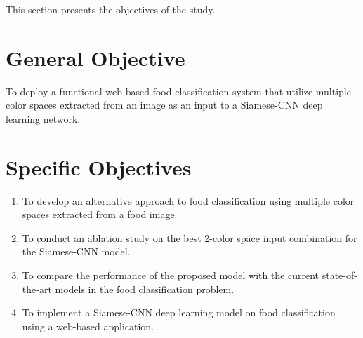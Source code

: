 This section presents the objectives of the study.
\section{General Objective}
To deploy a functional web-based food classification system that utilize multiple color spaces extracted from an image as an input to a Siamese-CNN deep learning network.
\section{Specific Objectives}
\begin{enumerate}
    \item To develop an alternative approach to food classification using multiple color spaces extracted from a food image.
    \item To conduct an ablation study on the best 2-color space input combination for the Siamese-CNN model.
    \item To compare the performance of the proposed model with the current state-of-the-art models in the food classification problem. 
    \item To implement a Siamese-CNN deep learning model on food classification using a web-based application.
\end{enumerate}